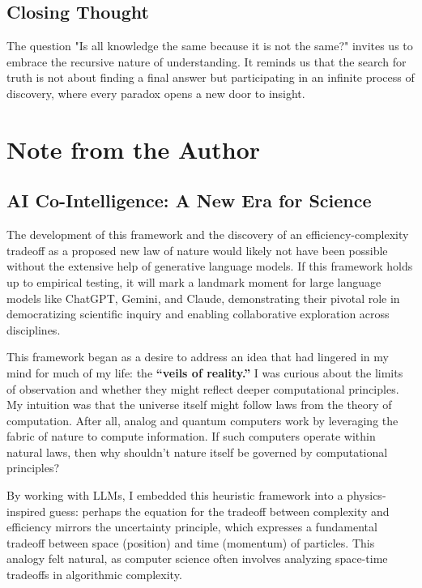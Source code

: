 \documentclass[12pt]{article}
\begin{document}
\subsection*{Closing Thought}
The question "Is all knowledge the same because it is not the same?" invites us to embrace the recursive nature of understanding. It reminds us that the search for truth is not about finding a final answer but participating in an infinite process of discovery, where every paradox opens a new door to insight.


\section*{Note from the Author}

\subsection*{AI Co-Intelligence: A New Era for Science}

The development of this framework and the discovery of an efficiency-complexity tradeoff as a proposed new law of nature would likely not have been possible without the extensive help of generative language models. If this framework holds up to empirical testing, it will mark a landmark moment for large language models like ChatGPT, Gemini, and Claude, demonstrating their pivotal role in democratizing scientific inquiry and enabling collaborative exploration across disciplines.

This framework began as a desire to address an idea that had lingered in my mind for much of my life: the \textbf{``veils of reality.''} I was curious about the limits of observation and whether they might reflect deeper computational principles. My intuition was that the universe itself might follow laws from the theory of computation. After all, analog and quantum computers work by leveraging the fabric of nature to compute information. If such computers operate within natural laws, then why shouldn’t nature itself be governed by computational principles?

By working with LLMs, I embedded this heuristic framework into a physics-inspired guess: perhaps the equation for the tradeoff between complexity and efficiency mirrors the uncertainty principle, which expresses a fundamental tradeoff between space (position) and time (momentum) of particles. This analogy felt natural, as computer science often involves analyzing space-time tradeoffs in algorithmic complexity.
\end{document}
